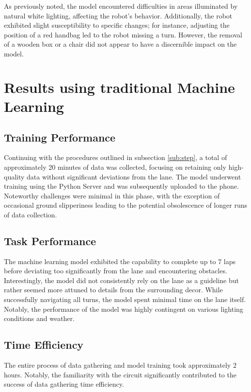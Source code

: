 \documentclass[12pt]{report}
\begin{document}
As previously noted, the model encountered difficulties in areas illuminated by natural white lighting, affecting the robot's behavior. Additionally, the robot exhibited slight susceptibility to specific changes; for instance, adjusting the position of a red handbag led to the robot missing a turn. However, the removal of a wooden box or a chair did not appear to have a discernible impact on the model.


\section{Results using traditional Machine Learning}
\label{sub:results_ml}
\subsection{Training Performance}
Continuing with the procedures outlined in subsection \ref{sub:step}, a total of approximately 20 minutes of data was collected, focusing on retaining only high-quality data without significant deviations from the lane. The model underwent training using the Python Server and was subsequently uploaded to the phone. Noteworthy challenges were minimal in this phase, with the exception of occasional ground slipperiness leading to the potential obsolescence of longer runs of data collection. 

\subsection{Task Performance}

The machine learning model exhibited the capability to complete up to 7 laps before deviating too significantly from the lane and encountering obstacles. Interestingly, the model did not consistently rely on the lane as a guideline but rather seemed more attuned to details from the surrounding decor. While successfully navigating all turns, the model spent minimal time on the lane itself. Notably, the performance of the model was highly contingent on various lighting conditions and weather.

\subsection{Time Efficiency}

The entire process of data gathering and model training took approximately 2 hours. Notably, the familiarity with the circuit significantly contributed to the success of data gathering time efficiency.
\end{document}
